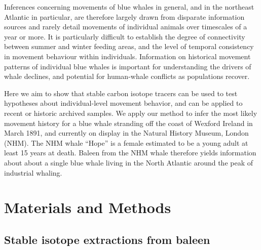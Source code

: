 \documentclass[a4paper,12pt]{article}
\begin{document}
Inferences concerning movements of blue whales in general, and in the northeast Atlantic in particular, are therefore largely drawn from disparate information sources and rarely detail movements of individual animals over timescales of a year or more. 
It is particularly difficult to establish the degree of connectivity between summer and winter feeding areas, and the level of temporal consistency in movement behaviour within individuals. 
Information on historical movement patterns of individual blue whales is important for understanding the drivers of whale declines, and potential for human-whale conflicts as populations recover.

Here we aim to show that stable carbon isotope tracers can be used to test hypotheses about individual-level movement behavior, and can be applied to recent or historic archived samples. 
We apply our method to infer the most likely movement history for a blue whale stranding off the coast of Wexford Ireland in March 1891, and currently on display in the Natural History Museum, London (NHM). 
The NHM whale ``Hope'' is a female estimated to be a young adult at least 15 years at death. 
Baleen from the NHM whale therefore yields information about about a single blue whale living in the North Atlantic around the peak of industrial whaling.

\section{Materials and Methods}\label{methods}

\subsection{Stable isotope extractions from baleen}
\label{stable-isotope-extractions-from-baleen}
\end{document}
